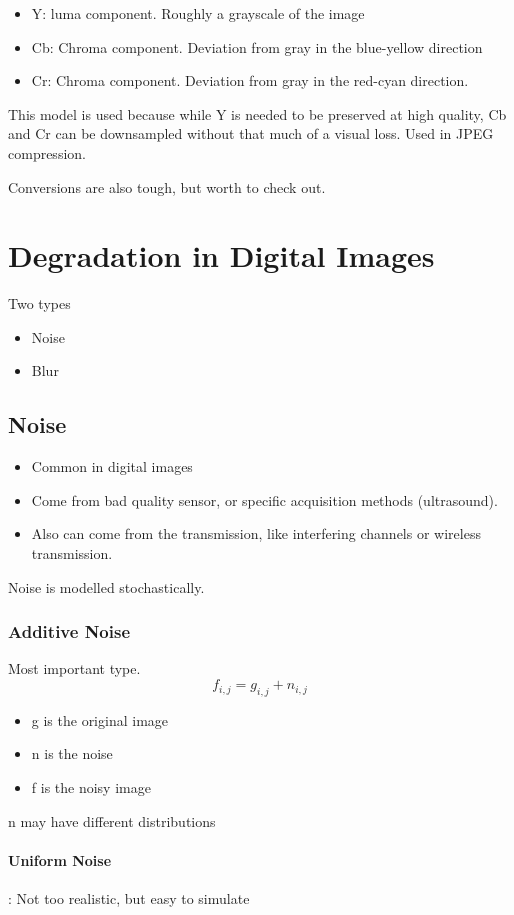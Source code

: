 \documentclass{article}
\begin{document}
\begin{itemize}
  \item Y: luma component. Roughly a grayscale of the image
  \item Cb: Chroma component. Deviation from gray in the blue-yellow direction
  \item Cr: Chroma component. Deviation from gray in the red-cyan direction.
\end{itemize}

This model is used because while Y is needed to be preserved at high quality, Cb and Cr can be downsampled without that much of a visual loss. Used in JPEG compression.

Conversions are also tough, but worth to check out.
\section{Degradation in Digital Images}
Two types
\begin{itemize}
  \item Noise
  \item Blur
\end{itemize}
\subsection{Noise}
\begin{itemize}
  \item Common in digital images
  \item Come from bad quality sensor, or specific acquisition methods (ultrasound).
  \item Also can come from the transmission, like interfering channels or wireless transmission.
\end{itemize}

Noise is modelled stochastically.

\subsubsection{Additive Noise}
Most important type. 
\[f_{i,j} = g_{i,j}+n_{i,j}\]
\begin{itemize}
  \item g is the original image
  \item n is the noise
  \item f is the noisy image
\end{itemize}

n may have different distributions

\paragraph{Uniform Noise}: Not too realistic, but easy to simulate
\end{document}
